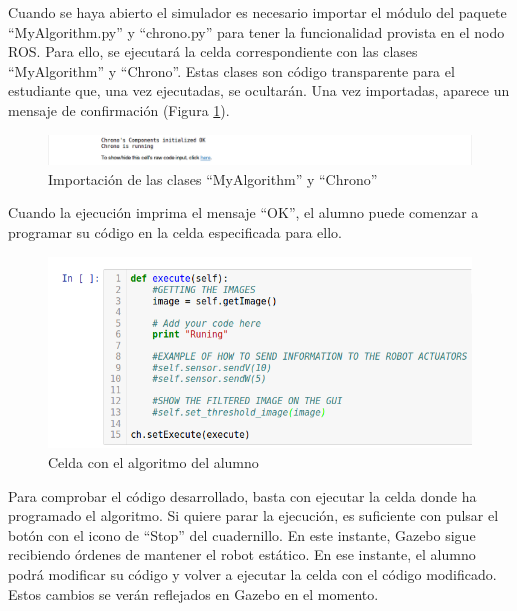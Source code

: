 Cuando se haya abierto el simulador es necesario importar el módulo del paquete ``MyAlgorithm.py'' y ``chrono.py'' para tener la funcionalidad provista en el nodo ROS. Para ello, se ejecutará la celda correspondiente con las clases ``MyAlgorithm'' y ``Chrono''. Estas clases son código transparente para el estudiante que, una vez ejecutadas, se ocultarán. Una vez importadas, aparece un mensaje de confirmación (Figura \ref{fig.cmdc}).

\begin{figure}[H]
  \begin{center}
    \includegraphics[width=1.5\textwidth]{figures/imp_Ma_CH.png}
		\caption{Importación de las clases ``MyAlgorithm'' y ``Chrono''}
		\label{fig.cmdc}
		\end{center}
\end{figure}


Cuando la ejecución imprima el mensaje ``OK'', el alumno puede comenzar a programar su código en la celda especificada para ello.

\begin{figure}[H]
  \begin{center}
    \includegraphics[width=.7\textwidth]{figures/celda_solucion_chrono.png}
		\caption{Celda con el algoritmo del alumno}
		\label{fig.ccach}
		\end{center}
\end{figure}

Para comprobar el código desarrollado, basta con ejecutar la celda donde ha programado el algoritmo. Si quiere parar la ejecución, es suficiente con pulsar el botón con el icono de ``Stop'' del cuadernillo. En este instante, Gazebo sigue recibiendo órdenes de mantener el robot estático. En ese instante, el alumno podrá modificar su código y volver a ejecutar la celda con el código modificado. Estos cambios se verán reflejados en Gazebo en el momento.

